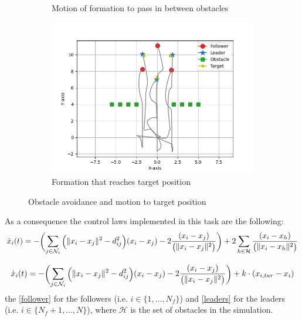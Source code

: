 \documentclass[a4paper,11pt,oneside]{book}
\begin{document}
\begin{figure}[h]
\begin{subfigure}{0.5\textwidth}
	\caption{Motion of formation to pass in between obstacles}
	\end{subfigure}
\vfill
	\begin{subfigure}{0.5\textwidth}	
	\includegraphics[width=\textwidth]{Hexagon_obstacle_target.jpg}
	\caption{Formation that reaches target position}
	\end{subfigure}
\caption{Obstacle avoidance and motion to target position}
\label{obstacle}
\end{figure}

As a consequence the control laws implemented in this task are the following:
\begin{equation}
\scriptsize
\dot{x}_i(t) = - \Biggl( \sum_{j \in \mathcal{N}_i} \bigg( \lVert x_i - x_j \rVert^2 - d_{ij}^2 \bigg) (x_i - x_j ) - 2  \frac{(x_i-x_j)}{\big( \lVert x_i - x_j \rVert^2 \big)} \Biggr) + 2  \sum_{h \in \mathcal{H}} \frac{(x_i-x_h)}{\big( \lVert x_i - x_h \rVert^2 \big)}  
\label{follower}
\end{equation}

\begin{equation}
\scriptsize
\dot{x}_i(t) = - \Biggl( \sum_{j \in \mathcal{N}_i} \bigg( \lVert x_i - x_j \rVert^2 - d_{ij}^2 \bigg) (x_i - x_j ) - 2  \frac{(x_i-x_j)}{\big( \lVert x_i - x_j \rVert^2 \big)} \Biggr) + k\cdot (x_{i,tar} - x_i)
\label{leaders}
\end{equation}
the \ref{follower} for the followers (i.e. $i \in \{1, \ldots, N_f\}$) and \ref{leaders} for the leaders (i.e. $i \in \{N_f+1, \ldots, N\}$), where $\mathcal{H}$ is the set of obstacles in the simulation.
\end{document}
